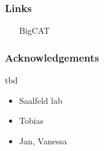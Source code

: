 \documentclass[aspectratio=169]{beamer}
\begin{document}
\begin{frame}
    \frametitle{Links}
    \begin{itemize}
          \item[BigCAT] 
    \end{itemize}
\end{frame}

\begin{frame}
    \frametitle{Acknowledgements}
    tbd
    \begin{itemize}
          \item Saalfeld lab
          \item Tobias
          \item Jan, Vanessa
    \end{itemize}
\end{frame}

    
\end{document}
